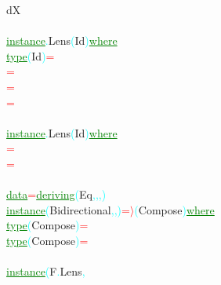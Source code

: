 {\rm{}dX}\\\\\textcolor{green}{\underline{instance}}\textcolor{cyan}{.}{\rm{}Lens}\hsspace \textcolor{cyan}{(}{\rm{}Id}\textcolor{cyan}{)}\hsspace \textcolor{green}{\underline{where}}\\\hstab \textcolor{green}{\underline{type}}\hsspace \textcolor{cyan}{(}{\rm{}Id}\textcolor{cyan}{)}\hsspace \textcolor{red}{=}\hsspace {\rm{}()}\\\hsspace \textcolor{red}{=}\hsspace {\rm{}()}\\\hsspace \hsspace \hsspace \textcolor{red}{=}\\\hsspace \hsspace \hsspace \textcolor{red}{=}\\\\\textcolor{green}{\underline{instance}}\textcolor{cyan}{.}{\rm{}Lens}\hsspace \textcolor{cyan}{(}{\rm{}Id}\textcolor{cyan}{)}\hsspace \textcolor{green}{\underline{where}}\\\hsspace \textcolor{red}{=}\\\hsspace \textcolor{red}{=}\\\\\textcolor{green}{\underline{data}}\hsspace \textcolor{red}{=}\hsspace \textcolor{green}{\underline{deriving}}\hsspace \textcolor{cyan}{(}{\rm{}Eq}\textcolor{cyan}{,}\textcolor{cyan}{,}\textcolor{cyan}{,}\textcolor{cyan}{)}\\\textcolor{green}{\underline{instance}}\hsspace \textcolor{cyan}{(}{\rm{}Bidirectional}\textcolor{cyan}{,}\textcolor{cyan}{,}\hsspace \textcolor{red}{\tilde{ }}\textcolor{cyan}{)}\hsspace \textcolor{red}{=\ensuremath{\rangle}}\hsspace \textcolor{cyan}{(}{\rm{}Compose}\textcolor{cyan}{)}\hsspace \textcolor{green}{\underline{where}}\\\hstab \textcolor{green}{\underline{type}}\hsspace \textcolor{cyan}{(}{\rm{}Compose}\textcolor{cyan}{)}\hsspace \textcolor{red}{=}\\\hstab \textcolor{green}{\underline{type}}\hsspace \textcolor{cyan}{(}{\rm{}Compose}\textcolor{cyan}{)}\hsspace \textcolor{red}{=}\\\\\textcolor{green}{\underline{instance}}\hsspace \textcolor{cyan}{(}{\rm{}F}\textcolor{cyan}{.}{\rm{}Lens}\textcolor{cyan}{,}\hsspace 